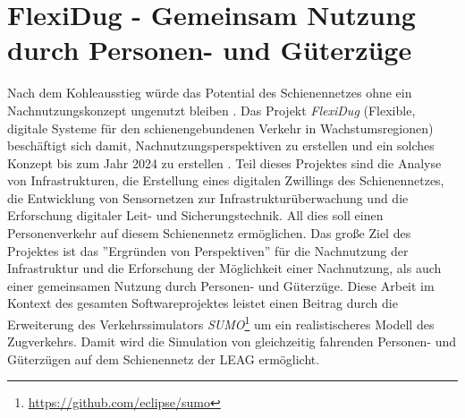 \section{FlexiDug - Gemeinsam Nutzung durch Personen- und Güterzüge}

Nach dem Kohleausstieg würde das Potential des Schienennetzes ohne ein Nachnutzungskonzept ungenutzt bleiben \cite{rbb_hpi_2022}. Das Projekt \emph{FlexiDug} (Flexible, digitale Systeme für den schienengebundenen Verkehr in Wachstumsregionen) beschäftigt sich damit, Nachnutzungsperspektiven zu erstellen und ein solches Konzept bis zum Jahr 2024 zu erstellen \cite{hasso_plattner_institut_flexidug_2022}. Teil dieses Projektes sind die Analyse von Infrastrukturen, die Erstellung eines digitalen Zwillings des Schienennetzes, die Entwicklung von Sensornetzen zur Infrastrukturüberwachung und die Erforschung digitaler Leit- und Sicherungstechnik. All dies soll einen Personenverkehr auf diesem Schienennetz ermöglichen. Das große Ziel des Projektes ist das ''Ergründen von Perspektiven'' für die Nachnutzung der Infrastruktur und die Erforschung der Möglichkeit einer Nachnutzung, als auch einer gemeinsamen Nutzung durch Personen- und Güterzüge. \cite{rbb_hpi_2022} Diese Arbeit im Kontext des gesamten Softwareprojektes leistet einen Beitrag durch die Erweiterung des Verkehrssimulators \emph{SUMO}\footnote{\url{https://github.com/eclipse/sumo}} um ein realistischeres Modell des Zugverkehrs. Damit wird die Simulation von gleichzeitig fahrenden Personen- und Güterzügen auf dem Schienennetz der LEAG ermöglicht.